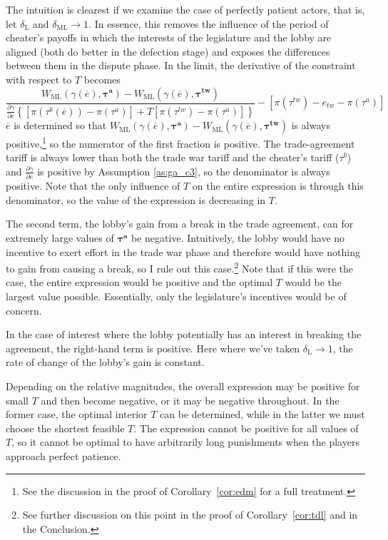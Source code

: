\documentclass[authoryear, review]{elsarticle}
\newcommand{\ov}{\overline}
\newcommand{\bta}{\bm{\tau^a}}
\newcommand{\ga}{\gamma}
\newcommand{\btw}{\bm{\tau^{tw}}}
\newcommand{\de}{\delta}
\begin{document}
The intuition is clearest if we examine the case of perfectly patient actors, that is, let $\de_\text{L}$ and $\de_\text{ML} \rightarrow 1$. In essence, this removes the influence of the period of cheater's payoffs in which the interests of the legislature and the lobby are aligned (both do better in the defection stage) and exposes the differences between them in the dispute phase. In the limit, the derivative of the constraint with respect to $T$ becomes
\begin{equation}
  \frac{ W_\text{ML}(\ga(\ov{e}),\bta) - W_\text{ML}(\ga(\ov{e}),\btw) }{\frac{\partial \ga}{\partial e} \left\{
  \left[ \pi(\tau^b(\ov{e})) - \pi(\tau^a) \right] + T \left[ \pi(\tau^{tw}) - \pi(\tau^a) \right]\right\}} - \left[ \pi(\tau^{tw}) - e_{tw} -\pi(\tau^a) \right]
 	\label{ine:Tdelta1}
\end{equation}
$\ov{e}$ is determined so that $W_\text{ML}(\ga(\ov{e}),\bta) - W_\text{ML}(\ga(\ov{e}),\btw)$ is always positive,\footnote{See the discussion in the proof of Corollary~\ref{cor:edm} for a full treatment.} so the numerator of the first fraction is positive. The trade-agreement tariff is always lower than both the trade war tariff and the cheater's tariff ($\tau^b$) and $\frac{\partial \ga}{\partial e}$ is positive by Assumption \ref{as:ga_c3}, so the denominator is always positive. Note that the only influence of $T$ on the entire expression is through this denominator, so the value of the expression is decreasing in $T$.

The second term, the lobby's gain from a break in the trade agreement, can for extremely large values of $\bta$ be negative. Intuitively, the lobby would have no incentive to exert effort in the trade war phase and therefore would have nothing to gain from causing a break, so I rule out this case.\footnote{See further discussion on this point in the proof of Corollary~\ref{cor:tdl} and in the Conclusion.} Note that if this were the case, the entire expression would be positive and the optimal $T$ would be the largest value possible. Essentially, only the legislature's incentives would be of concern.

In the case of interest where the lobby potentially has an interest in breaking the agreement, the right-hand term is positive. Here where we've taken $\de_\text{L} \rightarrow 1$, the rate of change of the lobby's gain is constant.

Depending on the relative magnitudes, the overall expression may be positive for small $T$ and then become negative, or it may be negative throughout. In the former case, the optimal interior $T$ can be determined, while in the latter we must choose the shortest feasible $T$. The expression cannot be positive for all values of $T$, so it cannot be optimal to have arbitrarily long punishments when the players approach perfect patience.
\end{document}
